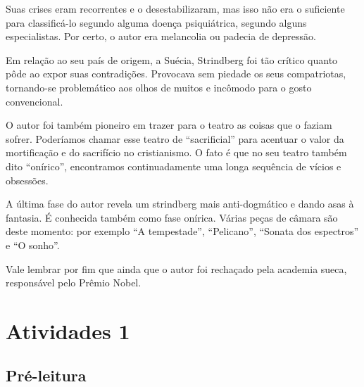 \documentclass[12pt]{extarticle}
\begin{document}
Suas crises eram recorrentes e o desestabilizaram, mas isso não era o suficiente para classificá-lo 
segundo alguma doença psiquiátrica, segundo alguns especialistas. 
Por certo, o autor era melancolia ou padecia de depressão.

Em relação ao seu país de origem, a Suécia, Strindberg foi tão 
crítico quanto pôde ao expor suas contradições.
Provocava sem piedade os seus compatriotas, tornando-se problemático aos olhos de muitos e incômodo para o gosto convencional.

O autor foi também pioneiro em trazer para o teatro as coisas que o faziam sofrer. Poderíamos chamar esse teatro de “sacrificial” para acentuar o valor da mortificação e do sacrifício no cristianismo. 
O fato é que no seu teatro também dito “onírico”, encontramos continuadamente uma longa sequência 
de vícios e obsessões. 

A última fase do autor revela um strindberg mais anti-dogmático e dando asas à fantasia. É conhecida também 
como fase onírica. Várias peças de câmara são deste momento: por exemplo “A tempestade”, “Pelicano”, 
“Sonata dos espectros” e “O sonho”.


Vale lembrar por fim que ainda que o autor foi rechaçado pela academia sueca, responsável pelo Prêmio Nobel.



\section{Atividades 1}


\subsection{Pré-leitura}


\end{document}
